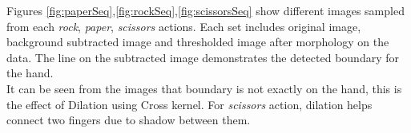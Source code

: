 \graphicspath{{./results/}}
Figures \ref{fig:paperSeq},\ref{fig:rockSeq},\ref{fig:scissorsSeq} show different images sampled from each \textit{rock}, \textit{paper}, \textit{scissors} actions. Each set includes original image, background subtracted image and thresholded image after morphology on the data. The line on the subtracted image demonstrates the detected boundary for the hand.\\
It can be seen from the images that boundary is not exactly on the hand, this is the effect of Dilation using Cross kernel. For \textit{scissors} action, dilation helps connect two fingers due to shadow between them.

\begin{figure}[htp]
\begin{center}
    \\

\end{center}
\end{figure}
